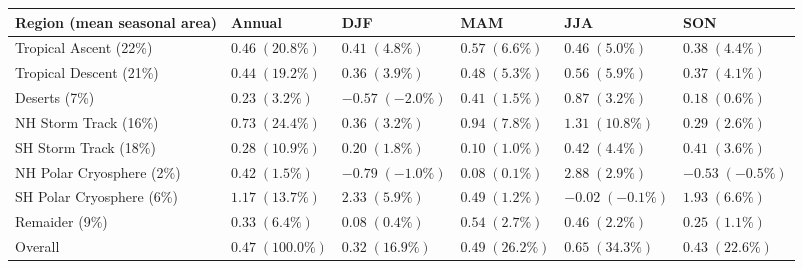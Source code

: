 \begin{tabular}{llllll}
\hline
Region (mean seasonal area) & Annual & DJF & MAM & JJA & SON \\
\hline
Tropical Ascent (22\%) & $\mathbf{0.46}\;(20.8\%)$ & $0.41\;(4.8\%)$ & $0.57\;(6.6\%)$ & $0.46\;(5.0\%)$ & $0.38\;(4.4\%)$ \\
Tropical Descent (21\%) & $\mathbf{0.44}\;(19.2\%)$ & $0.36\;(3.9\%)$ & $0.48\;(5.3\%)$ & $0.56\;(5.9\%)$ & $0.37\;(4.1\%)$ \\
Deserts (7\%) & $0.23\;(3.2\%)$ & $-0.57\;(-2.0\%)$ & $0.41\;(1.5\%)$ & $\mathbf{0.87}\;(3.2\%)$ & $0.18\;(0.6\%)$ \\
NH Storm Track (16\%) & $\mathbf{0.73}\;(24.4\%)$ & $\mathbf{0.36}\;(3.2\%)$ & $\mathbf{0.94}\;(7.8\%)$ & $\mathbf{1.31}\;(10.8\%)$ & $0.29\;(2.6\%)$ \\
SH Storm Track (18\%) & $0.28\;(10.9\%)$ & $0.20\;(1.8\%)$ & $0.10\;(1.0\%)$ & $0.42\;(4.4\%)$ & $0.41\;(3.6\%)$ \\
NH Polar Cryosphere (2\%) & $0.42\;(1.5\%)$ & $-0.79\;(-1.0\%)$ & $0.08\;(0.1\%)$ & $\mathbf{2.88}\;(2.9\%)$ & $-0.53\;(-0.5\%)$ \\
SH Polar Cryosphere (6\%) & $\mathbf{1.17}\;(13.7\%)$ & $\mathbf{2.33}\;(5.9\%)$ & $0.49\;(1.2\%)$ & $-0.02\;(-0.1\%)$ & $\mathbf{1.93}\;(6.6\%)$ \\
Remaider (9\%) & $\mathbf{0.33}\;(6.4\%)$ & $0.08\;(0.4\%)$ & $\mathbf{0.54}\;(2.7\%)$ & $\mathbf{0.46}\;(2.2\%)$ & $0.25\;(1.1\%)$ \\
Overall & $\mathbf{0.47}\;(100.0\%)$ & $\mathbf{0.32}\;(16.9\%)$ & $\mathbf{0.49}\;(26.2\%)$ & $\mathbf{0.65}\;(34.3\%)$ & $\mathbf{0.43}\;(22.6\%)$ \\
\hline
\end{tabular}

